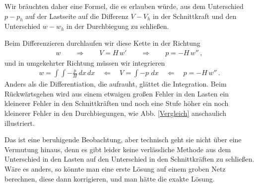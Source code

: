 Wir br\"{a}uchten daher eine Formel, die es erlauben w\"{u}rde, aus dem Unterschied $ p - p_{h}$ auf der Lastseite auf die Differenz $V - V_{h}$ in der Schnittkraft und den Unterschied $w - w_{h}$ in der Durchbiegung zu schlie{\ss}en.

Beim Differenzieren durchlaufen wir diese Kette in der Richtung
\begin{align}
 w \qquad \Rightarrow\qquad  V = H\,
w' \qquad  \Rightarrow\qquad  p = - H\, w''\,,
\end{align}
und in umgekehrter Richtung m\"{u}ssen wir integrieren
\begin{align}
 w = \int\!\!\! \int - \frac{p}{H} \,dx\, dx \!\quad \Leftarrow\quad  V = \int- p \,\,dx \quad \Leftarrow\quad  p
= - H \,w''\,.
\end{align}
Anders als die Differentiation, die aufrauht, gl\"{a}ttet die Integration. Beim R\"{u}ckw\"{a}rtsgehen wird aus einem etwaigen gro{\ss}en Fehler in den Lasten ein kleinerer Fehler in den Schnittkr\"{a}ften und noch eine Stufe h\"{o}her ein noch kleinerer Fehler in den Durchbiegungen, wie Abb. \ref{Vergleich} anschaulich illustriert.

Das ist eine beruhigende Beobachtung, aber technisch geht sie nicht \"{u}ber eine Vermutung hinaus, denn es gibt leider keine verl\"{a}ssliche Methode aus dem Unterschied in den Lasten auf den Unterschied in den Schnittkr\"{a}ften zu schlie{\ss}en. W\"{a}re es anders, so k\"{o}nnte man eine erste L\"{o}sung auf einem groben Netz berechnen, diese dann korrigieren, und man h\"{a}tte die exakte L\"{o}sung.

